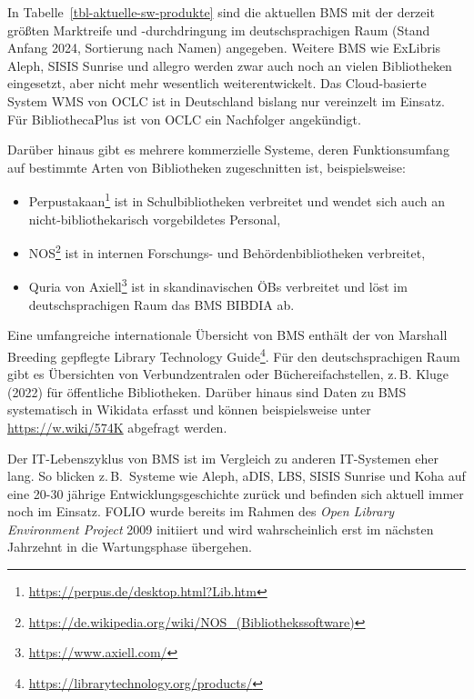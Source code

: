 \documentclass[
  11pt,
  letterpaper,
  DIV=11,
  twoside]{scrreprt}
\DeclareRobustCommand{\href}[2]{#2\footnote{\url{#1}}}
\begin{document}
In Tabelle~\ref{tbl-aktuelle-sw-produkte} sind die aktuellen BMS mit der
derzeit größten Marktreife und -durchdringung im deutschsprachigen Raum
(Stand Anfang 2024, Sortierung nach Namen) angegeben. Weitere BMS wie
ExLibris Aleph, SISIS Sunrise und allegro werden zwar auch noch an
vielen Bibliotheken eingesetzt, aber nicht mehr wesentlich
weiterentwickelt. Das Cloud-basierte System WMS von OCLC ist in
Deutschland bislang nur vereinzelt im Einsatz. Für BibliothecaPlus ist
von OCLC ein Nachfolger angekündigt.

Darüber hinaus gibt es mehrere kommerzielle Systeme, deren
Funktionsumfang auf bestimmte Arten von Bibliotheken zugeschnitten ist,
beispielsweise:

\begin{itemize}
\item
  \href{https://perpus.de/desktop.html?Lib.htm}{Perpustakaan} ist in
  Schulbibliotheken verbreitet und wendet sich auch an
  nicht-bibliothekarisch vorgebildetes Personal,
\item
  \href{https://de.wikipedia.org/wiki/NOS_(Bibliothekssoftware)}{NOS}
  ist in internen Forschungs- und Behördenbibliotheken verbreitet,
\item
  Quria von \href{https://www.axiell.com/}{Axiell} ist in
  skandinavischen ÖBs verbreitet und löst im deutschsprachigen Raum das
  BMS BIBDIA ab.
\end{itemize}

Eine umfangreiche internationale Übersicht von BMS enthält der von
Marshall Breeding gepflegte
\href{https://librarytechnology.org/products/}{Library Technology
Guide}. Für den deutschsprachigen Raum gibt es Übersichten von
Verbundzentralen oder Büchereifachstellen, z.\,B. Kluge (2022) für
öffentliche Bibliotheken. Darüber hinaus sind Daten zu BMS systematisch
in Wikidata erfasst und können beispielsweise unter
\url{https://w.wiki/574K} abgefragt werden.

\begin{tcolorbox}[enhanced jigsaw, leftrule=.75mm, toprule=.15mm, left=2mm, opacityback=0, arc=.35mm, colback=white, breakable, colframe=quarto-callout-tip-color-frame, rightrule=.15mm, bottomrule=.15mm]
\begin{minipage}[t]{5.5mm}
\textcolor{quarto-callout-tip-color}{\faLightbulb}
\end{minipage}%
\begin{minipage}[t]{\textwidth - 5.5mm}

Der \label{it-lebenszyklus}{IT-Lebenszyklus} von BMS ist
im Vergleich zu anderen IT-Systemen eher lang. So blicken z.\,B.~Systeme
wie Aleph, aDIS, LBS, SISIS Sunrise und Koha auf eine 20-30 jährige
Entwicklungsgeschichte zurück und befinden sich aktuell immer noch im
Einsatz. FOLIO wurde bereits im Rahmen des \emph{Open Library
Environment Project} 2009 initiiert und wird wahrscheinlich erst im
nächsten Jahrzehnt in die Wartungsphase übergehen.

\end{minipage}%
\end{tcolorbox}
\end{document}
